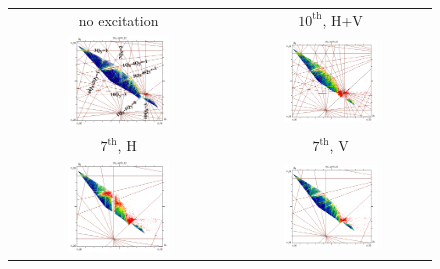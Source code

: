 \documentclass[%
 reprint,
 amsmath,amssymb,
 aps,
prstab,
longbibliography
]{revtex4-1}
\begin{document}
\begin{figure}
  \begin{tabular}{cc}
    no excitation & $10^{\mathrm{th}}$, H+V \\
    \includegraphics[width=0.49\textwidth]{2016injnocolc15o+19_6noerru_dp0_ord10_annotate.png} &
    \includegraphics[width=0.49\textwidth]{2016injnocolc15o+19_6noerrut10skhv_dp0_ord10.png}
    \\
    $7^{\mathrm{th}}$, H & $7^{\mathrm{th}}$, V \\
    \includegraphics[width=0.49\textwidth]{2016injnocolc15o+19_6noerrut7skh_dp0_ord7.png} &
    \includegraphics[width=0.49\textwidth]{2016injnocolc15o+19_6noerrut7skv_dp0_ord7.png} \\

\end{tabular}
\end{figure}
\end{document}
